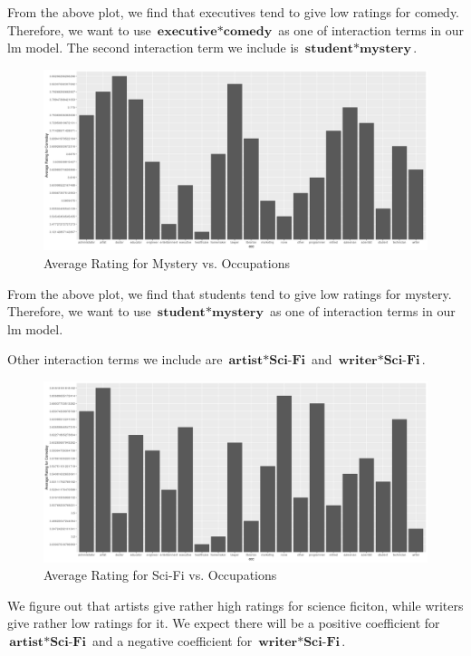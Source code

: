 \documentclass[11pt]{article}
\begin{document}
From the above plot, we find that executives tend to give low 
ratings for comedy. Therefore, we want to use $\textbf{executive} * \textbf{comedy}$ as 
one of interaction terms in our lm model.
\clearpage
The second interaction term we include is $\textbf{student} * \textbf{mystery}$.
\begin{figure}[ht!]
\begin{center}
\includegraphics[width=\textwidth]{mystrey_student.png}
\caption{Average Rating for Mystery vs. Occupations}
\end{center}
\end{figure}

From the above plot, we find that students tend to give low 
ratings for mystery. Therefore, we want to use $\textbf{student} * \textbf{mystery}$ as one of interaction terms in our lm model.
\clearpage

Other interaction terms we include are $\textbf{artist} * \textbf{Sci-Fi}$ and $\textbf{writer} * \textbf{Sci-Fi}$.
\begin{figure}[ht!]
\begin{center}
\includegraphics[width=\textwidth]{sci_fi.png}
\caption{Average Rating for Sci-Fi vs. Occupations}
\end{center}
\end{figure}
We figure out that artists give rather high ratings for science 
ficiton, while writers give rather low ratings for it. We expect
there will be a positive coefficient for $\textbf{artist} * \textbf{Sci-Fi}$ and a negative coefficient for $\textbf{writer} * \textbf{Sci-Fi}$.
\end{document}
